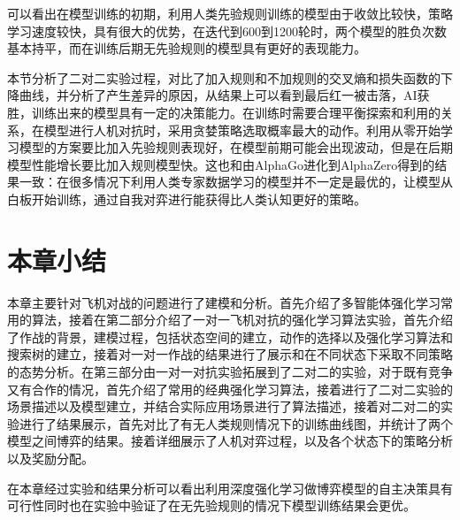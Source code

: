 可以看出在模型训练的初期，利用人类先验规则训练的模型由于收敛比较快，策略学习速度较快，具有很大的优势，在迭代到600到1200轮时，两个模型的胜负次数基本持平，而在训练后期无先验规则的模型具有更好的表现能力。

本节分析了二对二实验过程，对比了加入规则和不加规则的交叉熵和损失函数的下降曲线，并分析了产生差异的原因，从结果上可以看到最后红一被击落，AI获胜，训练出来的模型具有一定的决策能力。在训练时需要合理平衡探索和利用的关系，在模型进行人机对抗时，采用贪婪策略选取概率最大的动作。利用从零开始学习模型的方案要比加入先验规则表现好，在模型前期可能会出现波动，但是在后期模型性能增长要比加入规则模型快。这也和由AlphaGo进化到AlphaZero得到的结果一致：在很多情况下利用人类专家数据学习的模型并不一定是最优的，让模型从白板开始训练，通过自我对弈进行能获得比人类认知更好的策略。

\section{本章小结}
本章主要针对飞机对战的问题进行了建模和分析。首先介绍了多智能体强化学习常用的算法，接着在第二部分介绍了一对一飞机对抗的强化学习算法实验，首先介绍了作战的背景，建模过程，包括状态空间的建立，动作的选择以及强化学习算法和搜索树的建立，接着对一对一作战的结果进行了展示和在不同状态下采取不同策略的态势分析。在第三部分由一对一对抗实验拓展到了二对二的实验，对于既有竞争又有合作的情况，首先介绍了常用的经典强化学习算法，接着进行了二对二实验的场景描述以及模型建立，并结合实际应用场景进行了算法描述，接着对二对二的实验进行了结果展示，首先对比了有无人类规则情况下的训练曲线图，并统计了两个模型之间博弈的结果。接着详细展示了人机对弈过程，以及各个状态下的策略分析以及奖励分配。

在本章经过实验和结果分析可以看出利用深度强化学习做博弈模型的自主决策具有可行性同时也在实验中验证了在无先验规则的情况下模型训练结果会更优。

